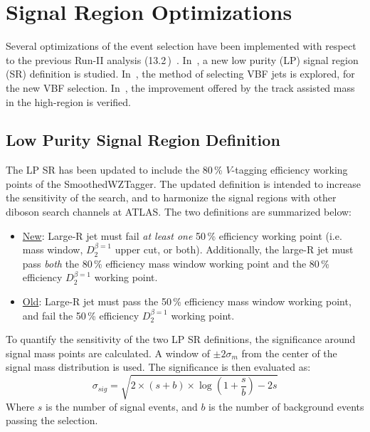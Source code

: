 \chapter{Signal Region Optimizations}
\label{ch:opt}

Several optimizations of the event selection have been implemented with respect to the previous Run-II analysis (13.2\,\ifb)~\cite{ichep2016supportnote, lvqq_conf_2016}. In~\Sect{\ref{ch:opt:newlp}}, a new low purity (LP) signal region (SR) definition is studied. In~\Sect{\ref{ch:opt:vbf}}, the method of selecting VBF jets is explored, for the new VBF selection. In~\Sect{\ref{sec:TAmass}}, the improvement offered by the track assisted mass in the high-\pT region is verified. 




%
\section{Low Purity Signal Region Definition}
\label{ch:opt:newlp}
The LP SR has been updated to include the 80\,\% $V$-tagging efficiency working points of the SmoothedWZTagger. The updated definition is intended to increase the sensitivity of the search, and to harmonize the signal regions with other diboson search channels at ATLAS. The two definitions are summarized below:
\begin{itemize}
\item\underline{New}: Large-R jet must fail {\em at least one} 50\,\% efficiency working point (i.e. mass window, $D_2^{\beta=1}$ upper cut, or both). Additionally, the large-R jet must pass {\em both} the 80\,\% efficiency mass window working point and the 80\,\% efficiency $D_2^{\beta=1}$ working point.
\item\underline{Old}: Large-R jet must pass the 50\,\% efficiency mass window working point, and fail the 50\,\% efficiency $D_2^{\beta=1}$ working point.
\end{itemize}

To quantify the sensitivity of the two LP SR definitions, the significance around signal mass points are calculated. A window of $\pm2\sigma_m$ from the center of the signal mass distribution is used. The significance is then evaluated as:
$$\sigma_{sig}=\sqrt{2\times(s+b)\times\log\left(1+\frac{s}{b}\right) - 2s}$$
Where $s$ is the number of signal events, and $b$ is the number of background events passing the selection.

